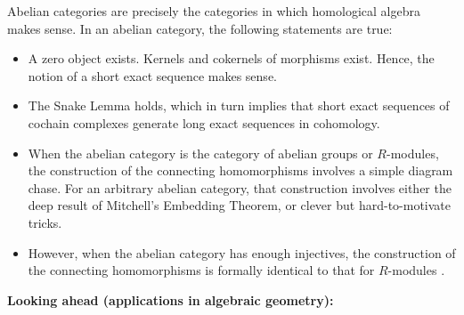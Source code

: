 Abelian categories are precisely the categories in which homological algebra makes sense.
In an abelian category, the following statements are true:
\begin{itemize}
\item
	A zero object exists.
	Kernels and cokernels of morphisms exist.
	Hence, the notion of a short exact sequence makes sense.
\item
	The Snake Lemma holds, which in turn implies that
	short exact sequences of cochain complexes generate long exact sequences in cohomology.
\item
	When the abelian category is the category of abelian groups or $R$-modules,
	the construction of the connecting homomorphisms involves a simple diagram chase.
	For an arbitrary abelian category, that construction involves either the deep result
	of Mitchell's Embedding Theorem, or clever but hard-to-motivate tricks.
\item
	However, when the abelian category has enough injectives,
	the construction of the connecting homomorphisms is formally identical to
	that for $R$-modules \cite{Surowski2000}.
\end{itemize}
\vskip 0.5cm
\noindent
\textbf{Looking ahead (applications in algebraic geometry):}
